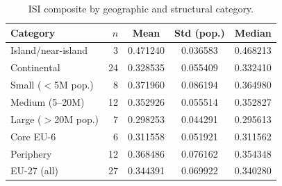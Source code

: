 \begin{table}[htbp]
\centering
\caption{ISI composite by geographic and structural category.}
\label{tab:geo-correlates}
\begin{tabular}{@{}l r S[table-format=1.6] S[table-format=1.6] S[table-format=1.6]@{}}
\toprule
{\textbf{Category}} & {$n$} & {\textbf{Mean}} & {\textbf{Std (pop.)}} & {\textbf{Median}} \\
\midrule
  Island/near-island & 3 & 0.471240 & 0.036583 & 0.468213 \\
  Continental & 24 & 0.328535 & 0.055409 & 0.332410 \\
  Small ($<$5M pop.) & 8 & 0.371960 & 0.086194 & 0.364980 \\
  Medium (5--20M) & 12 & 0.352926 & 0.055514 & 0.352827 \\
  Large ($>$20M pop.) & 7 & 0.298253 & 0.044291 & 0.295613 \\
  Core EU-6 & 6 & 0.311558 & 0.051921 & 0.311562 \\
  Periphery & 12 & 0.368486 & 0.076162 & 0.354348 \\
\midrule
  EU-27 (all) & 27 & 0.344391 & 0.069922 & 0.340280 \\
\bottomrule
\end{tabular}
\end{table}